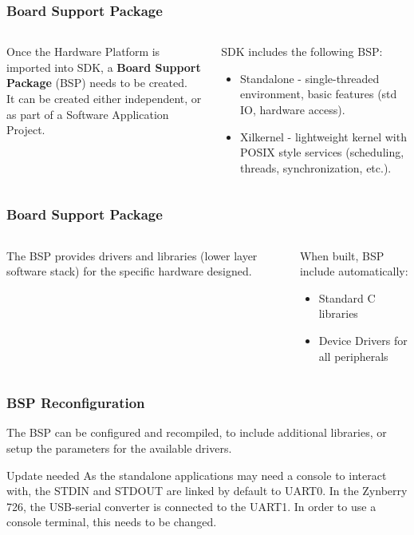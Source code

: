 \begin{frame}[fragile]
	\frametitle{Board Support Package}
	\begin{columns}
		\begin{column}{0.5\textwidth}
			Once the Hardware Platform is imported into SDK, a \textbf{Board Support Package} (BSP) needs to be created. \\
			\vspace{1em}
			It can be created either independent, or as part of a Software Application Project.
		\end{column}
		\begin{column}{0.5\textwidth}
			SDK includes the following BSP:
			\begin{itemize}
				\item Standalone - single-threaded environment, basic features (std IO, hardware access).
				\item Xilkernel - lightweight kernel with POSIX style services (scheduling, threads, synchronization, etc.).
			\end{itemize}
		\end{column}
	\end{columns}
\end{frame}

\begin{frame}
	\frametitle{Board Support Package}
	\begin{columns}
		\begin{column}{0.5\textwidth}
			The BSP provides drivers and libraries (lower layer software stack) for the specific hardware designed.
		\end{column}
		\begin{column}{0.5\textwidth}
			When built, BSP include automatically:
			\begin{itemize}
				\item Standard C libraries
				\item Device Drivers for all peripherals
			\end{itemize}
		\end{column}
	\end{columns}
\end{frame}

\begin{frame}
	\frametitle{BSP Reconfiguration}
	The BSP can be configured and recompiled, to include additional libraries, or setup the parameters for the available drivers.
	\vfill
	\begin{alertblock}{Update needed}
		As the standalone applications may need a console to interact with, the STDIN and STDOUT are linked by default to UART0. In the Zynberry 726, the USB-serial converter is connected to the UART1. In order to use a console terminal, this needs to be changed.
	\end{alertblock}
\end{frame}

